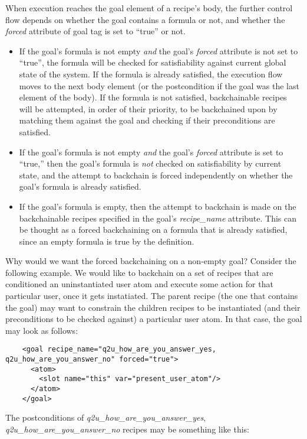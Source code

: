 When execution reaches the goal element of a recipe's body, the further control flow depends on whether the goal contains a formula or not, and whether the \textsl{forced} attribute of goal tag is set to ``true'' or not. 
\begin{itemize}
\item If the goal's formula is not empty \textit{and} the goal's \textsl{forced} attribute is not set to ``true'', the formula will be checked for satisfiability against current global state of the system. If the formula is already satisfied, the execution flow moves to the next body element (or the postcondition if the goal was the last element of the body). If the formula is not satisfied, backchainable recipes will be attempted, in order of their priority, to be backchained upon by matching them against the goal and checking if their preconditions are satisfied.
\item If the goal's formula is not empty \textit{and} the goal's \textsl{forced} attribute is set to ``true,'' then the goal's formula is \textit{not} checked on satisfiability by current state, and the attempt to backchain is forced independently on whether the goal's formula is already satisfied.
\item If the goal's formula is empty, then the attempt to backchain is made on the backchainable recipes specified in the goal's \textsl{recipe\_name} attribute. This can be thought as a forced backchaining on a formula that is already satisfied, since an empty formula is true by the definition.
\end{itemize}

Why would we want the forced backchaining on a non-empty goal? Consider the following example. We would like to backchain on a set of recipes that are conditioned an uninstantiated user atom and execute some action for that particular user, once it gets instatiated. The parent recipe (the one that contains the goal) may want to constrain the children recipes to be instantiated (and their preconditions to be checked against) a particular user atom. In that case, the goal may look as follows: 

\lstset{language=XML}
\begin{lstlisting}
    <goal recipe_name="q2u_how_are_you_answer_yes, q2u_how_are_you_answer_no" forced="true">
      <atom>
        <slot name="this" var="present_user_atom"/>
      </atom>
    </goal>
\end{lstlisting}

The postconditions of \textsl{q2u\_how\_are\_you\_answer\_yes}, \textsl{q2u\_how\_are\_you\_answer\_no} recipes may be something like this:

